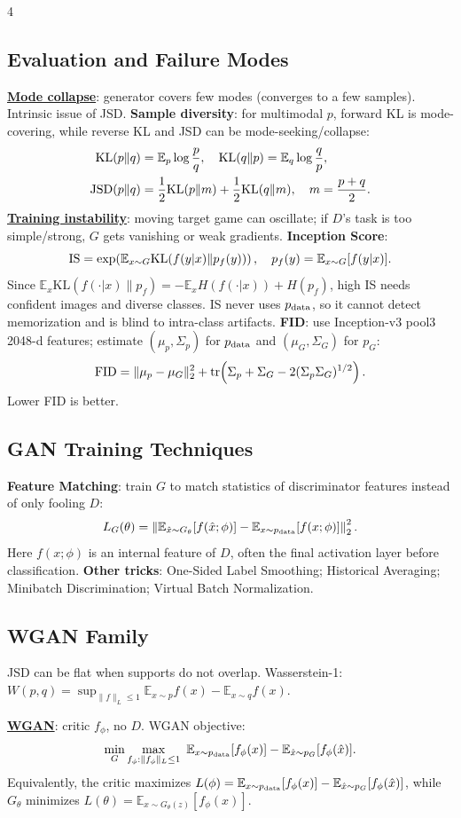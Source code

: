 \documentclass{article}
\newcommand{\key}[1]{\textbf{#1}}
\newcommand{\lowterm}[1]{\textbf{\underline{#1}}}
\newcommand{\E}{\mathbb{E}}
\newcommand{\KL}{\mathrm{KL}}
\newcommand{\1}{\mathbf 1}
\DeclareMathOperator{\tr}{tr}
\begin{document}
\begin{multicols*}{4}
\subsection{Evaluation and Failure Modes}
\lowterm{Mode collapse}: generator covers few modes (converges to a few samples). Intrinsic issue of JSD. \key{Sample diversity}: for multimodal $p$, forward KL is mode-covering, while reverse KL and JSD can be mode-seeking/collapse:
\[
\begin{aligned}
\KL(p\|q)&=\E_p\log\frac{p}{q},\quad
\KL(q\|p)=\E_q\log\frac{q}{p},\\
{\rm JSD}(p\|q)&=\frac12\KL(p\|m)+\frac12\KL(q\|m),\quad m=\frac{p+q}{2}.
\end{aligned}
\]
\lowterm{Training instability}: moving target game can oscillate; if $D$'s task is too simple/strong, $G$ gets vanishing or weak gradients. \key{Inception Score}:
\[
{\rm IS}=\exp\!\left(\E_{x\sim G}\KL(f(y|x)\|p_f(y))\right),\quad
p_f(y)=\E_{x\sim G}[f(y|x)].
\]
Since $\E_x\KL(f(\cdot|x)\|p_f)=-\E_xH(f(\cdot|x))+H(p_f)$, high IS needs confident images and diverse classes. IS never uses $p_{\rm data}$, so it cannot detect memorization and is blind to intra-class artifacts. \key{FID}: use Inception-v3 pool3 2048-d features; estimate $(\mu_p,\Sigma_p)$ for $p_{\rm data}$ and $(\mu_G,\Sigma_G)$ for $p_G$:
\[
{\rm FID}=\|\mu_p-\mu_G\|_2^2+
\tr\!\left(\Sigma_p+\Sigma_G-2(\Sigma_p\Sigma_G)^{1/2}\right).
\]
Lower FID is better.

\subsection{GAN Training Techniques}
\key{Feature Matching}: train $G$ to match statistics of discriminator features instead of only fooling $D$:
\[
L_G(\theta)=\left\|
\E_{\hat x\sim G_\theta}[f(\hat x;\phi)]
-\E_{x\sim p_{\rm data}}[f(x;\phi)]
\right\|_2^2.
\]
Here $f(x;\phi)$ is an internal feature of $D$, often the final activation layer before classification.
\key{Other tricks}: One-Sided Label Smoothing; Historical Averaging; Minibatch Discrimination; Virtual Batch Normalization.

\subsection{WGAN Family}
JSD can be flat when supports do not overlap. Wasserstein-1:
\(
W(p,q)=\sup_{\|f\|_L\le1}\E_{x\sim p}f(x)-\E_{x\sim q}f(x).
\) 

\lowterm{WGAN}: critic $f_\phi$, no $D$. 
WGAN objective:
\[
\min_G\max_{f_\phi:\|f_\phi\|_L\le1}\ \E_{x\sim p_{\rm data}}[f_\phi(x)]-\E_{\hat x\sim p_G}[f_\phi(\hat x)].
\]
Equivalently, the critic maximizes $L(\phi)=\E_{x\sim p_{\rm data}}[f_\phi(x)]-\E_{\hat x\sim p_G}[f_\phi(\hat x)]$, while $G_\theta$ minimizes $L(\theta)=\E_{x\sim G_\theta(z)}[f_\phi(x)]$.



\end{multicols*}
\end{document}
